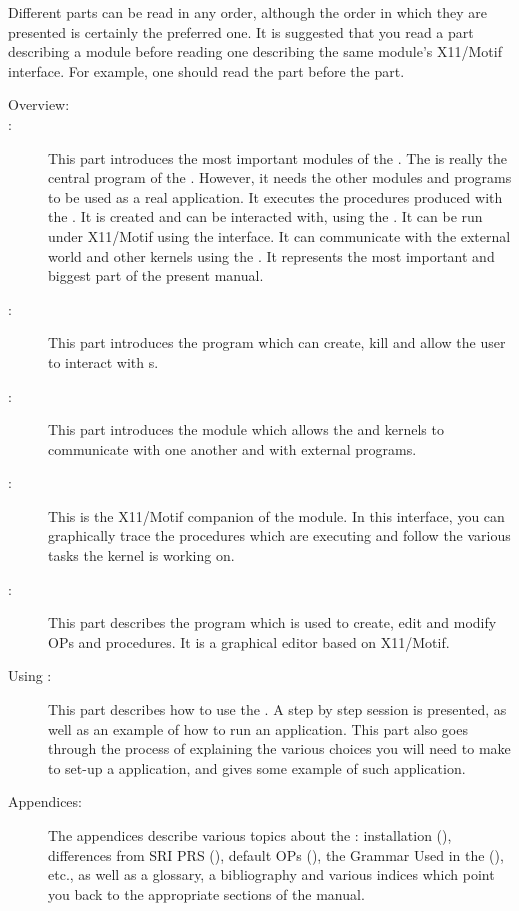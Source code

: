 Different parts can be read in any order, although the order in which they
are presented is certainly the preferred one. It is suggested that you read a part describing a 
module before reading one describing the
same module's X11/Motif interface. For example, one should read the
\CPK{} part before the \XPK{} part.

\begin{description}

\item[Overview:]

\item[\CPK{}:] This part introduces the most important modules of the
\COPRSDE{}.  The \CPK{} is really the central program of the \COPRSDE{}. However,
it needs the other modules and programs to be used as a real application. It
executes the procedures produced with the \OPE{}. It is created and can be
interacted with, using the \OPRSS{}. It can be run under X11/Motif using the
\XOPRS{} interface. It can communicate with the external world and other \COPRS{}
kernels using the \MPA{}. It represents the most important and biggest part of
the present manual.

\item[\OPRSS{}:] This part introduces the \OPRSS{} program which can create, kill
and allow the user to interact with \CPK{}s.

\item[\MPA{}:] This part introduces the module which allows the \COPRS{} and
\XOPRS{} kernels to communicate with one another and with external programs.

\item[\XPK{}:] This is the X11/Motif companion of the \CPK{} module. In this
interface, you can graphically trace the procedures which are executing and
follow the various tasks the kernel is working on.

\item[\OPE{}:] This part describes the program which is used to create, edit
and modify OPs and procedures. It is a graphical editor based on X11/Motif.

\item[Using \COPRS{}:] This part describes how to use the \COPRSDE{}. A step by
step \OPE{} session is presented, as well as an example of how to run an \XPK{}
application. This part also goes through the process of explaining the various
choices you will need to make to set-up a \COPRS{} application, and gives some
example of such application.

\item[Appendices:] The appendices describe various topics about the \COPRSDE{}:
installation (),
differences from SRI PRS (),
default OPs (), the Grammar Used in the \COPRSDE{}
(), etc., as well as a glossary, a bibliography
and various indices which point you back to the appropriate sections of the
manual.

\end{description}

